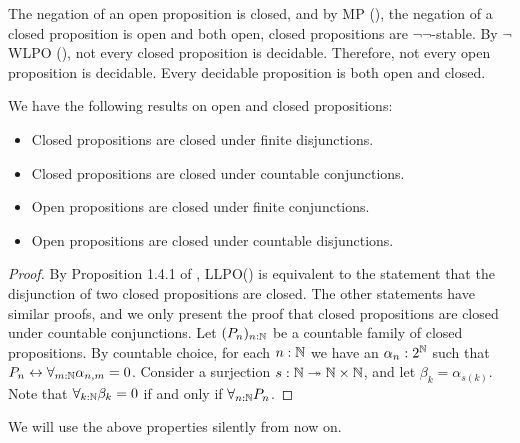 \begin{remark}\label{rmkOpenClosedNegation}
  The negation of an open proposition is closed, 
  and by MP (), the negation of a closed proposition is open %
  and both open, closed propositions are $\neg\neg$-stable. 
  By $\neg$WLPO (), 
  not every closed proposition is decidable. 
  Therefore, not every open proposition is decidable. 
  Every decidable proposition is both open and closed.
\end{remark}
\begin{lemma}
  We have the following results on open and closed propositions:
  \begin{itemize}
    \item Closed propositions are closed under finite disjunctions. 
    \item Closed propositions are closed under countable conjunctions. 
    \item Open propositions are closed under finite conjunctions. 
    \item Open propositions are closed under countable disjunctions. 
  \end{itemize}
\end{lemma}
\begin{proof}
  By Proposition 1.4.1 of \cite{HannesDiener}, LLPO() is equivalent to the statement that 
  the disjunction of two closed propositions are closed. 
  The other statements have similar proofs, and we only present the proof that closed propositions are closed under 
  countable conjunctions. 
  Let $(P_n)_{n:\mathbb{N}}$ be a countable family of closed propositions. 
  By countable choice, for each 
  $n:\mathbb{N}$ we have an $\alpha_n:2^{\mathbb{N}} $ 
  such that $P_n \leftrightarrow \forall_{m:\mathbb{N}} \alpha_{n,m} =0$. 
  Consider a surjection $s:\mathbb{N} \twoheadrightarrow \mathbb{N} \times \mathbb{N}$, and let 
  $\beta_k = \alpha_{s(k)}.$
  Note that $\forall_{k:\mathbb{N}} \beta_k = 0$ if and only if 
  $\forall_{n:\mathbb{N}} P_n$. 
\end{proof}
We will use the above properties silently from now on. 
